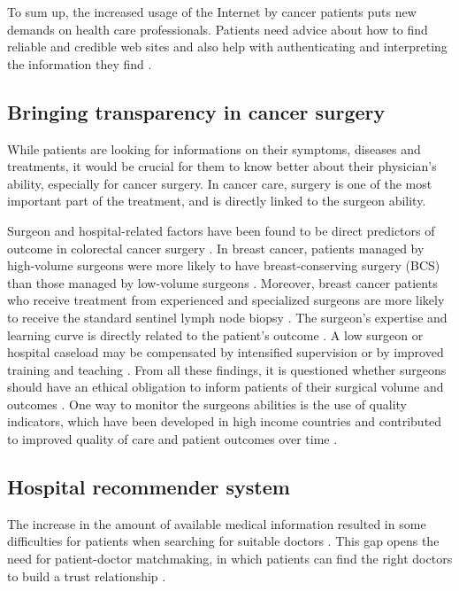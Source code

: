 To sum up, the increased usage of the Internet by cancer patients puts new demands on health care professionals. Patients need advice about how to find reliable and credible web sites and also help with authenticating and interpreting the information they find \cite{carlsson_cancer_2009}.

\subsection{Bringing transparency in cancer surgery}

While patients are looking for informations on their symptoms, diseases and treatments, it would be crucial for them to know better about their physician's ability, especially for cancer surgery. In cancer care, surgery is one of the most important part of the treatment, and is directly linked to the surgeon ability.

Surgeon and hospital-related factors have been found to be direct predictors of outcome in colorectal cancer surgery \cite{renzulli_influence_2006, bonati_surgeon_2021}. In breast cancer, patients managed by high-volume surgeons were more likely to have breast-conserving surgery (BCS) than those managed by low-volume surgeons \cite{mcdermott_surgeon_2013}. Moreover, breast cancer patients who receive treatment from experienced and specialized surgeons are more likely to receive the standard sentinel lymph node biopsy \cite{yen_surgeon_2014}. The surgeon's expertise and learning curve is directly related to the patient's outcome \cite{renzulli_learning_2005}. A low surgeon or hospital caseload may be compensated by intensified supervision or by improved training and teaching \cite{bonati_surgeon_2021}. From all these findings, it is questioned whether surgeons should have an ethical obligation to inform patients of their surgical volume and outcomes \cite{glaser_surgeon_2019}. One way to monitor the surgeons abilities is the use of quality indicators, which have been developed in high income countries and contributed to improved quality of care and patient outcomes over time \cite{nietz_quality_2020}.

\subsection{Hospital recommender system}

The increase in the amount of available medical information resulted in some difficulties for patients when searching for suitable doctors \cite{narducci_recommender_2015, hoens_reliable_2010}. This gap opens the need for patient-doctor matchmaking, in which patients can find the right doctors to build a trust relationship \cite{han_hybrid_2018}.

